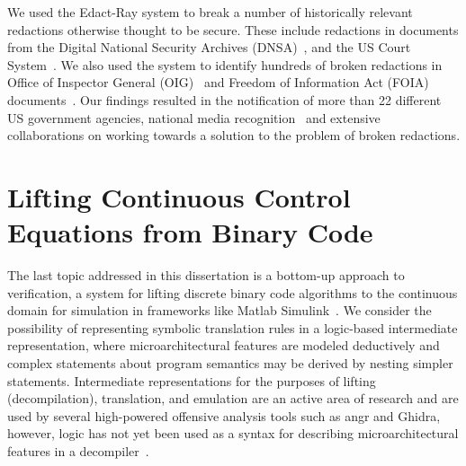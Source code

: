 We used the Edact-Ray system to break a number of historically relevant redactions otherwise thought to be secure.
These include redactions in documents from the Digital National Security Archives (DNSA)~\cite{dnsaSite}, and the US Court System~\cite{pacerSite}.
We also used the system to identify hundreds of broken redactions in Office of Inspector General (OIG)~\cite{oigReports} and Freedom of Information Act (FOIA) documents~\cite{govattic}.
Our findings resulted in the notification of more than 22 different US government agencies, national media recognition~\cite{wired} and extensive collaborations on working towards a solution to the problem of broken redactions.

\section{Lifting Continuous Control Equations from Binary Code}

The last topic addressed in this dissertation is a bottom-up approach to verification, a 
system for lifting discrete binary code algorithms to the continuous domain for simulation
in frameworks like Matlab Simulink~\cite{bland2023integreat, matlab}.
We consider the possibility of representing symbolic translation rules in a logic-based intermediate representation, where microarchitectural features are modeled deductively and complex statements about program semantics may be derived by nesting simpler statements.
Intermediate representations for the purposes of lifting (decompilation), translation, and emulation are an active area of research and are used by several high-powered offensive analysis tools such as angr and Ghidra, however, logic has not yet been used as a syntax for describing microarchitectural features in a decompiler~\cite{lattner2021mlir, quinlan2000rose, chen2022metaemu, eagle2020ghidra, kim2017testing, stanier2013intermediate}.

